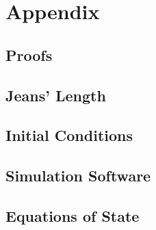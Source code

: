 \chapter{Appendix}\label{sec:appendix}

\section{Proofs}\label{app:proofs}


\section{Jeans' Length}\label{app:jeans}


\section{Initial Conditions}\label{app:ics}


\section{Simulation Software}\label{app:isg}


\section{\sv}\label{app:survis}


\section{Equations of State}\label{app:eos_imp}


